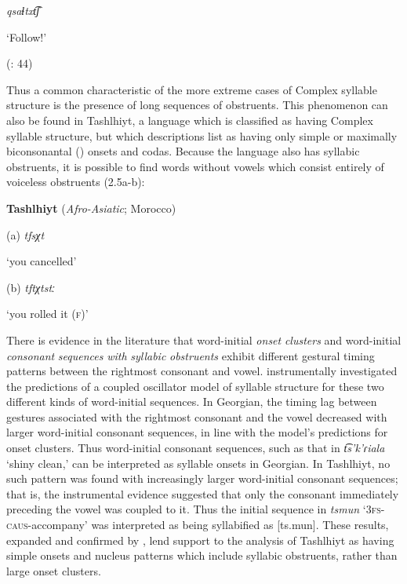   \textit{qsaɬtxt͡ʃ}



  ‘Follow!’



  (\citealt{GeorgVolodin1999}: 44)


\z

  Thus a common characteristic of the more extreme cases of Complex syllable structure is the presence of long sequences of obstruents. This phenomenon can also be found in Tashlhiyt, a language which is classified as having Complex syllable structure, but which descriptions list as having only simple \citep{Ridouane2008} or maximally biconsonantal (\citealt{PuechLouali1999}) onsets and codas. Because the language also has syllabic obstruents, it is possible to find words without vowels which consist entirely of voiceless obstruents (2.5a-b):



\ea\label{ex:(2.5)}
   \textbf{Tashlhiyt} (\textit{Afro-Asiatic}; Morocco)



(a)  \textit{tfsχt}



‘you cancelled’



(b)  \textit{tftχtstː}



‘you rolled it (\textsc{f})’



  \citep[95]{Ridouane2002}
\z



  There is evidence in the literature that word-initial \textit{onset} \textit{clusters} and word-initial \textit{consonant} \textit{sequences} \textit{with} \textit{syllabic} \textit{obstruents} exhibit different gestural timing patterns between the rightmost consonant and vowel. \citet{GoldsteinEtAl2007} instrumentally investigated the predictions of a coupled oscillator model of syllable structure for these two different kinds of word-initial sequences. In Georgian, the timing lag between gestures associated with the rightmost consonant and the vowel decreased with larger word-initial consonant sequences, in line with the model’s predictions for onset clusters. Thus word-initial consonant sequences, such as that in \textit{t͡s’k’ɾiala} ‘shiny clean,’ can be interpreted as syllable onsets in Georgian. In Tashlhiyt, no such pattern was found with increasingly larger word-initial consonant sequences; that is, the instrumental evidence suggested that only the consonant immediately preceding the vowel was coupled to it. Thus the initial sequence in \textit{tsmun} ‘\textsc{3fs}{}-\textsc{caus}{}-accompany’ was interpreted as being syllabified as [ts.mun]. These results, expanded and confirmed by \citet{HermesEtAl2011}, lend support to the analysis of Tashlhiyt as having simple onsets and nucleus patterns which include syllabic obstruents, rather than large onset clusters.



